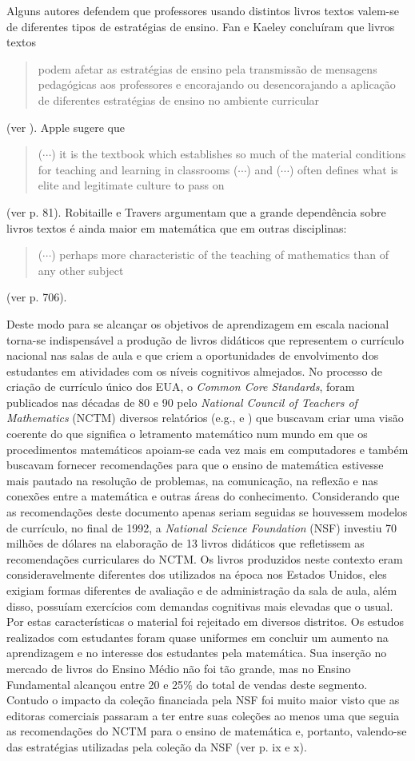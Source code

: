 \documentclass[10 pt]{article}
\begin{document}
Alguns autores defendem que professores usando distintos livros textos valem-se de diferentes tipos de estratégias de ensino. 
Fan e Kaeley concluíram que livros textos \blockquote{podem afetar as estratégias de ensino pela transmissão de mensagens pedagógicas aos professores e encorajando ou desencorajando a aplicação de diferentes estratégias de ensino no ambiente curricular} (ver \cite{fan2000influence}). Apple sugere que {\it 
\blockquote{($\cdots$) it is the textbook which establishes so much of the material conditions for teaching and learning in classrooms ($\cdots$) and ($\cdots$) often defines what is elite and legitimate culture to pass on}} (ver \cite{apple2013teachers} p. 81). Robitaille e Travers argumentam que a grande dependência sobre livros textos é ainda maior em matemática que em outras disciplinas:
{\it \blockquote{($\cdots$) perhaps more characteristic of the teaching of mathematics than of any other subject}} (ver \cite{robitaille1992international} p. 706).

Deste modo para se alcançar os objetivos de aprendizagem em escala nacional torna-se indispensável a produção de livros didáticos que representem o currículo nacional nas salas de aula e que criem a oportunidades de envolvimento dos estudantes em atividades com os níveis cognitivos almejados. 
No processo de criação de currículo único dos EUA, o {\it Common Core Standards}, foram publicados nas décadas de 80 e 90 pelo {\it National Council of Teachers of Mathematics} (NCTM) diversos relatórios (e.g., \cite{} e \cite{}) que buscavam criar uma visão coerente do que significa o letramento matemático num mundo em que os procedimentos matemáticos apoiam-se cada vez mais em computadores e também buscavam	 fornecer recomendações para que o ensino de matemática estivesse mais pautado na resolução de problemas, na comunicação, na reflexão e nas conexões entre a matemática e outras áreas do conhecimento.
Considerando que as recomendações deste documento apenas seriam seguidas se houvessem modelos de currículo,  no final de 1992, a {\it National Science Foundation} (NSF) investiu 70 milhões de dólares na elaboração de 13 livros didáticos que refletissem as recomendações curriculares do NCTM. 
Os livros produzidos neste contexto eram consideravelmente diferentes dos utilizados na época nos Estados Unidos, eles exigiam formas diferentes de avaliação e de administração da sala de aula, além disso, possuíam exercícios com demandas cognitivas mais elevadas que o usual. 
Por estas características o material foi rejeitado em diversos distritos. 
Os estudos realizados com estudantes foram quase uniformes em concluir um aumento na aprendizagem e no interesse dos estudantes pela matemática. 
Sua inserção no mercado de livros do Ensino Médio não foi tão grande, mas no Ensino Fundamental alcançou entre 20 e 25$\%$ do total de vendas deste segmento. 
Contudo o impacto da coleção financiada pela NSF foi muito maior visto que as editoras comerciais passaram a ter entre suas coleções ao menos uma que seguia as recomendações do NCTM para o ensino de matemática e, portanto, valendo-se das estratégias utilizadas pela coleção da NSF (ver \cite{Perspectives on the Design and Development of School Mathematics Curricula} p. ix e x).
\end{document}
